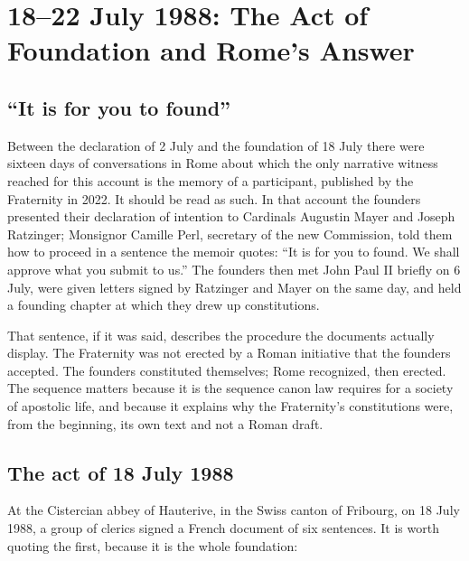 \section{18--22 July 1988: The Act of Foundation and Rome's Answer}

\subsection{``It is for you to found''}

Between the declaration of 2 July and the foundation of 18 July there
were sixteen days of conversations in Rome about which the only narrative
witness reached for this account is the memory of a participant,
published by the Fraternity in 2022. It should be read as such. In that
account the founders presented their declaration of intention to
Cardinals Augustin Mayer and Joseph Ratzinger; Monsignor Camille Perl,
secretary of the new Commission, told them how to proceed in a sentence
the memoir quotes: ``It is for you to found. We shall approve what you
submit to us.'' The founders then met John Paul II briefly on 6 July,
were given  letters signed by Ratzinger and Mayer on the
same day, and held a founding chapter at which they drew up
constitutions.

That sentence, if it was said, describes the procedure the documents
actually display. The Fraternity was not erected by a Roman initiative
that the founders accepted. The founders constituted themselves; Rome
recognized, then erected. The sequence matters because it is the
sequence canon law requires for a society of apostolic life, and because
it explains why the Fraternity's constitutions were, from the beginning,
its own text and not a Roman draft.

\subsection{The act of 18 July 1988}

At the Cistercian abbey of Hauterive, in the Swiss canton of Fribourg, on
18 July 1988, a group of clerics signed a French document of six
sentences. It is worth quoting the first, because it is the whole
foundation:

